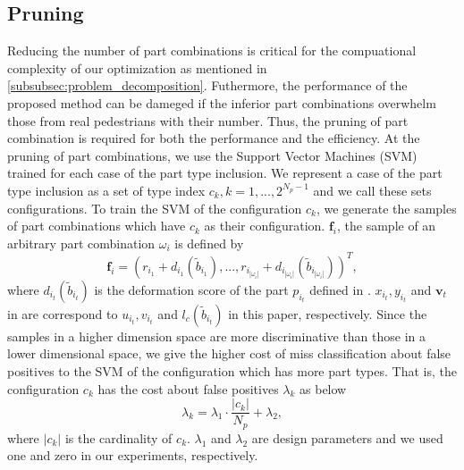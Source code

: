 \documentclass[runningheads]{llncs}
\begin{document}
\subsection{Pruning}
\label{subsec:pruning}
Reducing the number of part combinations is critical for the compuational complexity of our optimization as mentioned in \ref{subsubsec:problem_decomposition}.
Futhermore, the performance of the proposed method can be dameged if the inferior part combinations overwhelm those from real pedestrians with their number.
Thus, the pruning of part combination is required for both the performance and the efficiency.
At the pruning of part combinations, we use the Support Vector Machines (SVM)~\cite{cortes1995support} trained for each case of the part type inclusion.
We represent a case of the part type inclusion as a set of type index $c_k, k=1,...,2^{N_p-1}$ and we call these sets configurations.
To train the SVM of the configuration $c_k$, we generate the samples of part combinations which have $c_k$ as their configuration.
$\mathbf{f}_i$, the sample of an arbitrary part combination $\omega_i$ is defined by
\begin{equation}
   \label{eq:svm_sample_vector}
   \mathbf{f}_i = (r_{i_1}+d_{i_1}(\tilde{b}_{i_1}), ..., r_{i_{|\omega_i|}}+d_{i_{|\omega_i|}}(\tilde{b}_{i_{|\omega_i|}}))^T,
\end{equation}
where $d_{i_t}(\tilde{b}_{i_t})$ is the deformation score of the part $p_{i_t} $ defined in \cite{felzenszwalb2010object}. 
$x_{i_t},y_{i_t}$ and $\mathbf{v}_t$ in \cite{felzenszwalb2010object} are correspond to $u_{i_t},v_{i_t}$ and $l_c(\tilde{b}_{i_t})$ in this paper, respectively.
Since the samples in a higher dimension space are more discriminative than those in a lower dimensional space, we give the higher cost of miss classification about false positives to the SVM of the configuration which has more part types.
That is, the configuration $c_k$ has the cost about false positives $\lambda_k$ as below
\begin{equation}
   \label{eq:svm_fp_cost}
   \lambda_k = \lambda_{1} \cdot \frac{|c_k|}{N_p} + \lambda_{2},
\end{equation}
where $|c_k|$ is the cardinality of $c_k$. $\lambda_{1}$ and $\lambda_{2}$ are design parameters and we used one and zero in our experiments, respectively.
\end{document}
